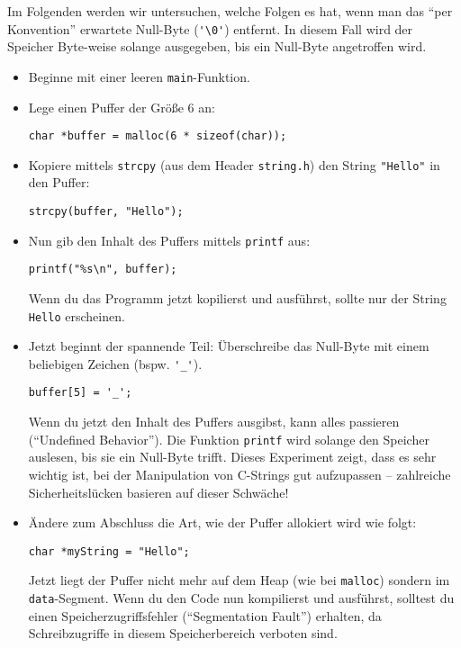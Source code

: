 Im Folgenden werden wir untersuchen, welche Folgen es hat, wenn man das \enquote{per Konvention} erwartete Null-Byte (\lstinline|'\0'|) entfernt.
In diesem Fall wird der Speicher Byte-weise solange ausgegeben, bis ein Null-Byte angetroffen wird.
\begin{itemize}
\item 
Beginne mit einer leeren \lstinline|main|-Funktion.
\item 
Lege einen Puffer der Größe 6 an:
\begin{lstlisting}
char *buffer = malloc(6 * sizeof(char));
\end{lstlisting}
\item 
Kopiere mittels \lstinline|strcpy| (aus dem Header \lstinline|string.h|) den String \lstinline|"Hello"| in den Puffer:
\begin{lstlisting}
strcpy(buffer, "Hello");
\end{lstlisting}
\item 
Nun gib den Inhalt des Puffers mittels \lstinline|printf| aus:
\begin{lstlisting}
printf("%s\n", buffer);
\end{lstlisting}
Wenn du das Programm jetzt kopilierst und ausführst, sollte nur der String \lstinline|Hello| erscheinen.
\item 
Jetzt beginnt der spannende Teil:
Überschreibe das Null-Byte mit einem beliebigen Zeichen (bspw. \lstinline|'_'|).
\begin{lstlisting}
buffer[5] = '_';
\end{lstlisting}
Wenn du jetzt den Inhalt des Puffers ausgibst, kann alles passieren (\enquote{Undefined Behavior}).
Die Funktion \lstinline|printf| wird solange den Speicher auslesen, bis sie ein Null-Byte trifft.
Dieses Experiment zeigt, dass es sehr wichtig ist, bei der Manipulation von C-Strings gut aufzupassen -- 
zahlreiche Sicherheitslücken basieren auf dieser Schwäche!
\item
Ändere zum Abschluss die Art, wie der Puffer allokiert wird wie folgt:
\begin{lstlisting}
char *myString = "Hello";
\end{lstlisting}
Jetzt liegt der Puffer nicht mehr auf dem Heap (wie bei \lstinline|malloc|) sondern im \texttt{data}-Segment.
Wenn du den Code nun kompilierst und ausführst, solltest du einen Speicherzugriffsfehler (\enquote{Segmentation Fault}) erhalten, da Schreibzugriffe in diesem Speicherbereich verboten sind.
\end{itemize}

